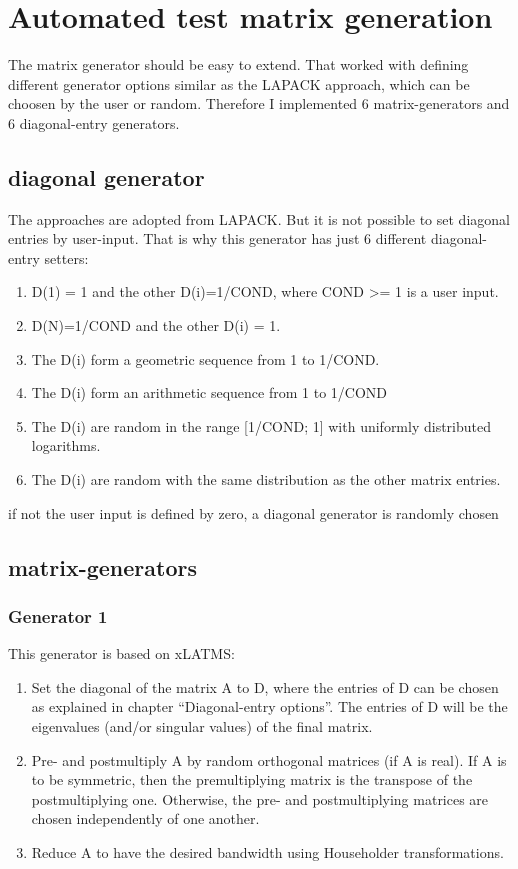 \documentclass[a4paper]{article}
\begin{document}
\section{Automated test matrix generation}

The matrix generator should be easy to extend.  
That worked with defining different generator options similar as the LAPACK approach, which can be choosen by the user or random.
Therefore I implemented 6 matrix-generators and 6 diagonal-entry generators.

\subsection{diagonal generator}
The approaches are adopted from LAPACK. But it is not possible to set diagonal entries by user-input. That is why this generator has just 6 different diagonal-entry setters:
\begin{enumerate}
	\item D(1) = 1 and the other D(i)=1/COND, where COND >= 1 is a user input.
	\item D(N)=1/COND and the other D(i) = 1. 
	\item The D(i) form a geometric sequence from 1 to 1/COND. 
	\item The D(i) form an arithmetic sequence from 1 to 1/COND
	\item The D(i) are random in the range [1/COND; 1] with uniformly distributed logarithms. 
	\item The D(i) are random with the same distribution as the other matrix entries.
\end{enumerate}
if not the user input is defined by zero, a diagonal generator is randomly chosen

\subsection{matrix-generators}

\subsubsection{Generator 1}
This generator is based on xLATMS: 

\begin{enumerate}
	\item Set the diagonal of the matrix A to D, where the entries of D can be chosen as explained in chapter “Diagonal-entry options”. The entries of D will be the eigenvalues (and/or singular values) of the final matrix.
	\item Pre- and postmultiply A by random orthogonal matrices (if A is real). If A is to be symmetric, then the premultiplying matrix is the transpose of the postmultiplying one. Otherwise, the pre- and postmultiplying matrices are chosen independently of one another.
	\item Reduce A to have the desired bandwidth using Householder transformations.
\end{enumerate}
\end{document}
